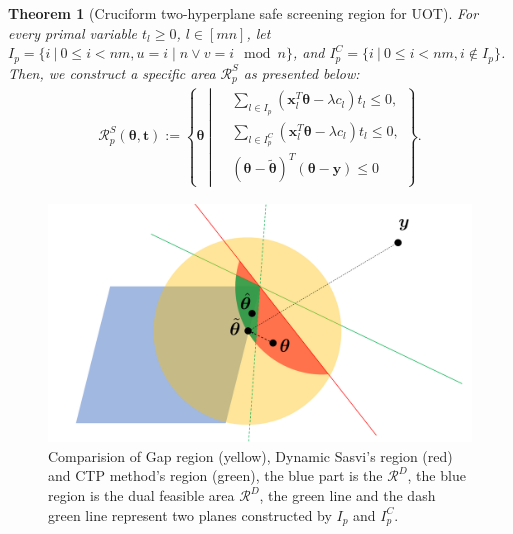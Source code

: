 \documentclass[twoside]{article}
\theoremstyle{plain}
\newtheorem{thm}{Theorem}
\renewcommand{\vec}[1]{\bm{#1}}
\begin{document}
\begin{thm}[Cruciform two-hyperplane safe screening region for UOT]
\label{Thm:AreaScreeningUOT}
For every primal variable $t_l \geq  0$, $l \in [mn]$, let $I_p = \{ i \ | \  0\leq i<nm, u = i\mid n \vee v = i\mod n\}$, and ${I}^{C}_p = \{ i \ | \  0\leq i<nm, i \notin I_p\}$. Then, we construct a specific area $\mathcal{R}^{S}_{p}$ as presented below:
\begin{equation}
\label{Eq:FinalRS}
\begin{split} 
\mathcal{R}^S_{p}(\vec{\theta}, \vec{t}):= \left\{\vec{\theta} \ \left|\ 
\begin{aligned}
 &\sum_{l\in I_p}(\vec{x}_{l}^{T}\vec{\theta} - \lambda {c}_l)t_l\leq 0, \\
 &\sum_{l\in {I}^{C}_p}(\vec{x}_{l} ^{T}\vec{\theta}- \lambda {c}_l)t_l\leq 0, \\
  &(\vec{\theta}-\tilde{\vec{\theta}})^T(\vec{\theta}-\vec{y})\leq 0
\end{aligned}
\right.
\right\}.
\end{split}
\end{equation}
\end{thm}


\begin{figure}[t]
\centering
\includegraphics[width = \linewidth]{pic/area}
\caption{Comparision of Gap region (yellow), Dynamic Sasvi's region (red) and CTP method's region (green), the blue part is the $\mathcal{R}^{D}$, the blue region is the dual feasible area $\mathcal {R}^{D}$, the green line and the dash green line represent two planes constructed by $I_p$ and $I_p^C$.}
\label{Fig:area}
\end{figure}
\end{document}
